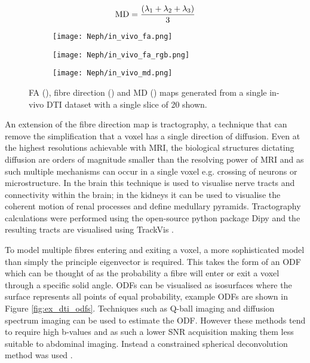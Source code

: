 \begin{equation}
	\textup{MD} = \frac{\left( \lambda_1 + \lambda_2 + \lambda_3 \right)}{3}
	\label{eq:ex_dti_md}
\end{equation}

\begin{figure}[H]
	\centering
	\begin{subfigure}[c]{0.31\textwidth}
		\centering
			\texttt{[image: Neph/in\_vivo\_fa.png]}
		\caption{}
		\label{fig:ex_dti_fa}
	\end{subfigure}
	\hfill
	\begin{subfigure}[c]{0.31\textwidth}
		\centering
			\texttt{[image: Neph/in\_vivo\_fa\_rgb.png]}
		\caption{}
		\label{fig:ex_dti_fa_rgb}
	\end{subfigure}
	\hfill	
	\begin{subfigure}[c]{0.31\textwidth}
		\centering
			\texttt{[image: Neph/in\_vivo\_md.png]}
		\caption{}
		\label{fig:ex_dti_md}
	\end{subfigure}
	\caption{\ac{FA} (), fibre direction () and \ac{MD} () maps generated from a single in-vivo \ac{DTI} dataset with a single slice of 20 shown.}
	\label{fig:ex_dti_maps}
\end{figure}

An extension of the fibre direction map is tractography, a technique that can remove the simplification that a voxel has a single direction of diffusion. Even at the highest resolutions achievable with \ac{MRI}, the biological structures dictating diffusion are orders of magnitude smaller than the resolving power of \ac{MRI} and as such multiple mechanisms can occur in a single voxel e.g. crossing of neurons or microstructure. In the brain this technique is used to visualise nerve tracts and connectivity within the brain; in the kidneys it can be used to visualise the coherent motion of renal processes and define medullary pyramids. Tractography calculations were performed using the open-source python package Dipy \cite{garyfallidis_dipy_2014} and the resulting tracts are visualised using TrackVis \cite{wang_diffusion_2007}.

To model multiple fibres entering and exiting a voxel, a more sophisticated model than simply the principle eigenvector is required. This takes the form of an \ac{ODF} which can be thought of as the probability a fibre will enter or exit a voxel through a specific solid angle. \acp{ODF} can be visualised as isosurfaces where the surface represents all points of equal probability, example \acp{ODF} are shown in Figure \ref{fig:ex_dti_odfs}. Techniques such as Q-ball imaging \cite{descoteaux_regularized_2007, hess_q-ball_2006} and diffusion spectrum imaging \cite{descoteaux_regularized_2007} can be used to estimate the \ac{ODF}. However these methods tend to require high b-values and as such a lower \ac{SNR} acquisition making them less suitable to abdominal imaging. Instead a constrained spherical deconvolution method was used \cite{tournier_direct_2004, tournier_robust_2007, tax_recursive_2014}.


